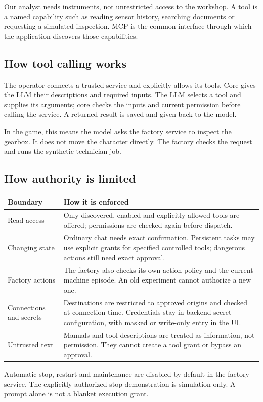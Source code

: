 Our analyst needs instruments, not unrestricted access to the workshop. A tool is a named capability such as reading sensor history, searching documents or requesting a simulated inspection. MCP is the common interface through which the application discovers those capabilities.

\subsection*{How tool calling works}
The operator connects a trusted service and explicitly allows its tools. Core gives the LLM their descriptions and required inputs. The LLM selects a tool and supplies its arguments; core checks the inputs and current permission before calling the service. A returned result is saved and given back to the model.

In the game, this means the model asks the factory service to inspect the gearbox. It does not move the character directly. The factory checks the request and runs the synthetic technician job.

\subsection*{How authority is limited}
\begin{tabularx}{\linewidth}{@{}p{.30\linewidth}X@{}}\toprule
Boundary & How it is enforced\\\midrule
Read access & Only discovered, enabled and explicitly allowed tools are offered; permissions are checked again before dispatch.\\
Changing state & Ordinary chat needs exact confirmation. Persistent tasks may use explicit grants for specified controlled tools; dangerous actions still need exact approval.\\
Factory actions & The factory also checks its own action policy and the current machine episode. An old experiment cannot authorize a new one.\\
Connections and secrets & Destinations are restricted to approved origins and checked at connection time. Credentials stay in backend secret configuration, with masked or write-only entry in the UI.\\
Untrusted text & Manuals and tool descriptions are treated as information, not permission. They cannot create a tool grant or bypass an approval.\\\bottomrule
\end{tabularx}

Automatic stop, restart and maintenance are disabled by default in the factory service. The explicitly authorized stop demonstration is simulation-only. A prompt alone is not a blanket execution grant.

